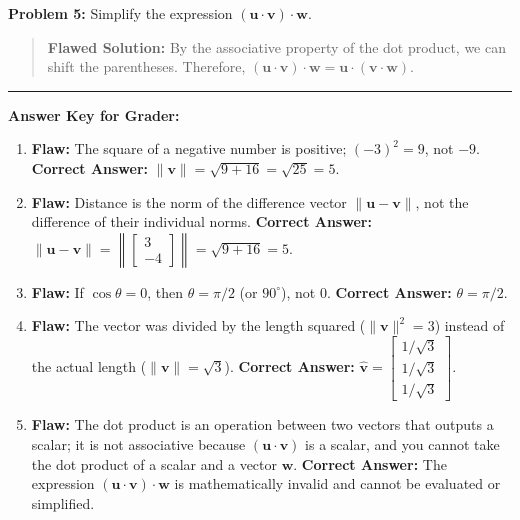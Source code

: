 \documentclass[11pt, letterpaper]{article}
\theoremstyle{definition}
\theoremstyle{remark}
\begin{document}
\textbf{Problem 5:} Simplify the expression $(\mathbf{u} \cdot \mathbf{v}) \cdot \mathbf{w}$.
\begin{quote}
\textbf{Flawed Solution:}
By the associative property of the dot product, we can shift the parentheses. Therefore, $(\mathbf{u} \cdot \mathbf{v}) \cdot \mathbf{w} = \mathbf{u} \cdot (\mathbf{v} \cdot \mathbf{w})$.
\end{quote}

\vspace{2em}
\hrule
\vspace{1em}
\textbf{Answer Key for Grader:}
\begin{enumerate}
    \item \textbf{Flaw:} The square of a negative number is positive; $(-3)^2 = 9$, not $-9$. \textbf{Correct Answer:} $\|\mathbf{v}\| = \sqrt{9+16} = \sqrt{25} = 5$.
    \item \textbf{Flaw:} Distance is the norm of the difference vector $\|\mathbf{u} - \mathbf{v}\|$, not the difference of their individual norms. \textbf{Correct Answer:} $\|\mathbf{u} - \mathbf{v}\| = \left\| \begin{bmatrix} 3 \\ -4 \end{bmatrix} \right\| = \sqrt{9+16} = 5$.
    \item \textbf{Flaw:} If $\cos \theta = 0$, then $\theta = \pi/2$ (or $90^\circ$), not $0$. \textbf{Correct Answer:} $\theta = \pi/2$.
    \item \textbf{Flaw:} The vector was divided by the length squared ($\|\mathbf{v}\|^2 = 3$) instead of the actual length ($\|\mathbf{v}\| = \sqrt{3}$). \textbf{Correct Answer:} $\mathbf{\hat{v}} = \begin{bmatrix} 1/\sqrt{3} \\ 1/\sqrt{3} \\ 1/\sqrt{3} \end{bmatrix}$.
    \item \textbf{Flaw:} The dot product is an operation between two vectors that outputs a scalar; it is not associative because $(\mathbf{u} \cdot \mathbf{v})$ is a scalar, and you cannot take the dot product of a scalar and a vector $\mathbf{w}$. \textbf{Correct Answer:} The expression $(\mathbf{u} \cdot \mathbf{v}) \cdot \mathbf{w}$ is mathematically invalid and cannot be evaluated or simplified.
\end{enumerate}
\end{document}
